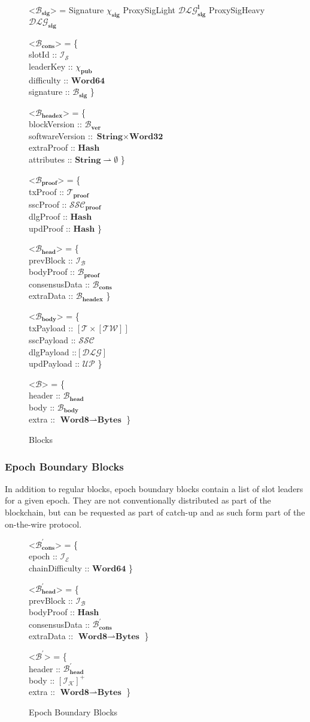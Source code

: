 \documentclass{article}
\def\fld{\\\llap{,\quad}}%
\newcommand{\rhu}{\rightharpoonup}
\newcommand{\lists}[1]{\left[{#1}\right]}
\newcommand{\nelists}[1]{\left[{#1}\right]^+}
\newcommand{\idsof}[1]{\mathcal{I}\!_#1}
\newcommand{\blockids}{\idsof{\blocks}}
\newcommand{\epochids}{\idsof{\mathcal{E}}}
\newcommand{\slotids}{\idsof{\mathcal{S}}}
\newcommand{\stakeholderids}{\idsof{\mathcal{K}}}
\newcommand{\pubkey}{\chi_{\textbf{pub}}}
\newcommand{\signature}{\chi_{\textbf{sig}}}
\newcommand{\txs}{\mathcal{T}}
\newcommand{\txpf}{\txs_{\textbf{proof}}}
\newcommand{\twit}{\mathcal{TW}}
\newcommand{\ssc}{\mathcal{SSC}}
\newcommand{\sscpf}{\ssc_{\textbf{proof}}}
\newcommand{\dlg}{\mathcal{DLG}}
\newcommand{\proxysig}{\dlg_{\textbf{sig}}}
\newcommand{\proxysiglight}{\dlg^{\textbf{l}}_{\textbf{sig}}}
\newcommand{\upd}{\mathcal{UP}}
\newcommand{\blocks}{\mathcal{B}}
\newcommand{\blockver}{\blocks_{\textbf{ver}}}
\newcommand{\bbodies}{\blocks_{\textbf{body}}}
\newcommand{\bheads}{\blocks_{\textbf{head}}}
\newcommand{\bheadcons}{\blocks_{\textbf{cons}}}
\newcommand{\bheadex}{\blocks_{\textbf{headex}}}
\newcommand{\blocksig}{\blocks_{\textbf{sig}}}
\newcommand{\blockpf}{\blocks_{\textbf{proof}}}
\newcommand{\ebb}{\mathcal{B}^\prime}
\newcommand{\ebbhead}{\ebb_{\textbf{head}}}
\newcommand{\ebbheadcons}{\ebb_{\textbf{cons}}}
\newcommand{\hstype}[1]{\textbf{#1}}
\newcommand{\String}{\hstype{String}}
\newcommand{\Word}[1]{\hstype{Word#1}}
\newcommand{\hash}{\hstype{Hash}}
\newcommand{\Bytes}{\hstype{Bytes}}
\begin{document}
\begin{figure}[H]
  \caption{Blocks}
  \label{fig:block}
  \begin{grammar}
    <$\blocksig$> = Signature $\signature$
    \alt ProxySigLight $\proxysiglight$
    \alt ProxySigHeavy $\proxysig$

    <$\bheadcons$> = \{
    \fld slotId :: $\slotids$
    \fld leaderKey :: $\pubkey$
    \fld difficulty :: $\Word{64}$
    \fld signature :: $\blocksig$
    \}

    <$\bheadex$> = \{
    \fld blockVersion :: $\blockver$
    \fld softwareVersion :: $\String \times \Word{32}$
    \fld extraProof :: $\hash$
    \fld attributes :: $\String \rhu \emptyset$
    \}

    <$\blockpf$> = \{
    \fld txProof :: $\txpf$
    \fld sscProof :: $\sscpf$
    \fld dlgProof :: $\hash$
    \fld updProof :: $\hash$
    \}

    <$\bheads$> = \{
    \fld prevBlock :: $\blockids$
    \fld bodyProof :: $\blockpf$
    \fld consensusData :: $\bheadcons$
    \fld extraData :: $\bheadex$
    \}

    <$\bbodies$> = \{
    \fld txPayload :: $\lists{\txs\times\lists{\twit}}$
    \fld sscPayload :: $\ssc$
    \fld dlgPayload ::$\lists{\dlg}$
    \fld updPayload :: $\upd$
    \}

    <$\blocks$> = \{
    \fld header :: $\bheads$
    \fld body :: $\bbodies$
    \fld extra :: $\Word{8} \rhu \Bytes$
    \}

  \end{grammar}
\end{figure}

\subsubsection{Epoch Boundary Blocks}

In addition to regular blocks, epoch boundary blocks contain a list of slot
leaders for a given epoch. They are not conventionally distributed as part of
the blockchain, but can be requested as part of catch-up and as such form part
of the on-the-wire protocol.

\begin{figure}[H]
  \begin{grammar}
    <$\ebbheadcons$> = \{
    \fld epoch :: $\epochids$
    \fld chainDifficulty :: $\Word{64}$
    \}

    <$\ebbhead$> = \{
    \fld prevBlock :: $\blockids$
    \fld bodyProof :: $\hash$
    \fld consensusData :: $\ebbheadcons$
    \fld extraData :: $\Word{8} \rhu \Bytes$
    \}

    <$\ebb$> = \{
    \fld header :: $\ebbhead$
    \fld body :: $\nelists{\stakeholderids}$
    \fld extra :: $\Word{8} \rhu \Bytes$
    \}
  \end{grammar}
  \caption{Epoch Boundary Blocks}
  \label{fig:ebb}
\end{figure}
\end{document}
